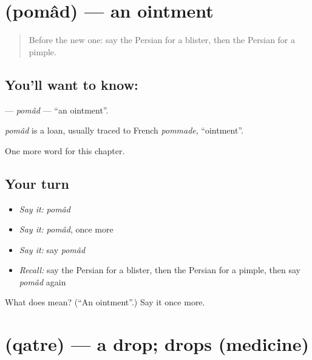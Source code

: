 \section[\texorpdfstring{\fa{پماد} (pomâd)}{پماد (pomâd)}]{ (pomâd) — an ointment}

\label{lesson:FA-C151-pomad}



\begin{quote}
Before the new one: say the Persian for a blister, then the Persian for a pimple.
\end{quote}

\subsection*{You'll want to know: }
\textbf{} — \emph{pomâd} — \textquotedblleft{}an ointment\textquotedblright{}.

\begin{cousinweb}
\emph{pomâd} is a loan, usually traced to French \emph{pommade}, \textquotedblleft{}ointment\textquotedblright{}.
\end{cousinweb}

\begin{grammarlens}[title={What you've built}]
One more word for this chapter.
\end{grammarlens}

\subsection*{Your turn}
\begin{itemize}
\raggedright
  \item \emph{Say it:} \emph{pomâd}
  \item \emph{Say it:} \emph{pomâd}, once more
  \item \emph{Say it:} say \emph{pomâd}
  \item \emph{Recall:} say the Persian for a blister, then the Persian for a pimple, then say \emph{pomâd} again
\end{itemize}

\begin{tcolorbox}[breakable,colback=teal!4,colframe=teal!35!black,title={Before you move on}]
What does  mean? (\textquotedblleft{}An ointment\textquotedblright{}.) Say it once more.
\end{tcolorbox}
\section[\texorpdfstring{\fa{قطره} (qatre)}{قطره (qatre)}]{ (qatre) — a drop; drops (medicine)}

